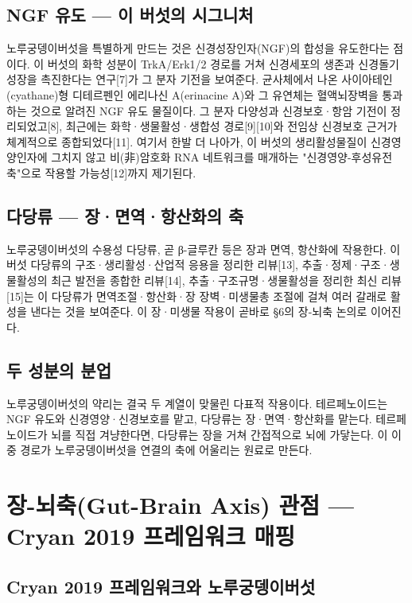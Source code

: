 \documentclass[12pt,oneside]{book}
\begin{document}
\subsection{NGF 유도 — 이 버섯의 시그니처}

노루궁뎅이버섯을 특별하게 만드는 것은 신경성장인자(NGF)의 합성을 유도한다는 점이다. 이 버섯의 화학 성분이 TrkA/Erk1/2 경로를 거쳐 신경세포의 생존과 신경돌기 성장을 촉진한다는 연구[7]가 그 분자 기전을 보여준다. 균사체에서 나온 사이아테인(cyathane)형 디테르펜인 에리나신 A(erinacine A)와 그 유연체는 혈액뇌장벽을 통과하는 것으로 알려진 NGF 유도 물질이다. 그 분자 다양성과 신경보호·항암 기전이 정리되었고[8], 최근에는 화학·생물활성·생합성 경로[9][10]와 전임상 신경보호 근거가 체계적으로 종합되었다[11]. 여기서 한발 더 나아가, 이 버섯의 생리활성물질이 신경영양인자에 그치지 않고 비(非)암호화 RNA 네트워크를 매개하는 "신경영양-후성유전 축"으로 작용할 가능성[12]까지 제기된다.

\subsection{다당류 — 장·면역·항산화의 축}

노루궁뎅이버섯의 수용성 다당류, 곧 β-글루칸 등은 장과 면역, 항산화에 작용한다. 이 버섯 다당류의 구조·생리활성·산업적 응용을 정리한 리뷰[13], 추출·정제·구조·생물활성의 최근 발전을 종합한 리뷰[14], 추출·구조규명·생물활성을 정리한 최신 리뷰[15]는 이 다당류가 면역조절·항산화·장 장벽·미생물총 조절에 걸쳐 여러 갈래로 활성을 낸다는 것을 보여준다. 이 장·미생물 작용이 곧바로 §6의 장-뇌축 논의로 이어진다.

\subsection{두 성분의 분업}

노루궁뎅이버섯의 약리는 결국 두 계열이 맞물린 다표적 작용이다. 테르페노이드는 NGF 유도와 신경영양·신경보호를 맡고, 다당류는 장·면역·항산화를 맡는다. 테르페노이드가 뇌를 직접 겨냥한다면, 다당류는 장을 거쳐 간접적으로 뇌에 가닿는다. 이 이중 경로가 노루궁뎅이버섯을 연결의 축에 어울리는 원료로 만든다.

\section{장-뇌축(Gut-Brain Axis) 관점 — Cryan 2019 프레임워크 매핑}

\subsection{Cryan 2019 프레임워크와 노루궁뎅이버섯}
\end{document}
